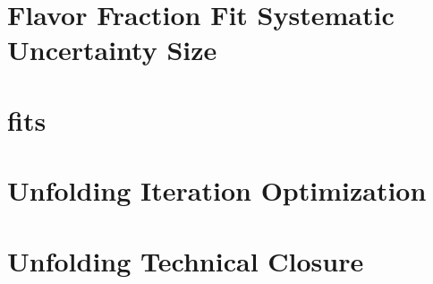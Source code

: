 \documentclass{report}
\begin{document}
\section{Flavor Fraction Fit Systematic Uncertainty Size}

\clearpage
\section{\subsdzero fits}

\clearpage
\section{Unfolding Iteration Optimization}

\clearpage
\section{Unfolding Technical Closure}



%

\end{document}

